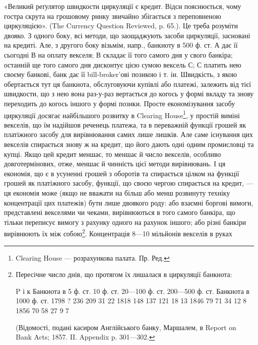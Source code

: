 «Великий реґулятор швидкости циркуляції є кредит. Відси пояснюється,
чому гостра скрута на грошовому ринку звичайно збігається з переповненою
циркуляцією». (The Currency Question Reviewed, p. 65.). Це треба розуміти
двояко. З одного боку, всі методи, що заощаджують засоби циркуляції, засновані
на кредиті. Але, з другого боку візьмім, напр., банкноту в 500 ф. ст. А дає її
сьогодні В на оплату векселя; В складає її того самого дня у свого банкіра;
останній ще того самого дня дисконтує цією сумою вексель С; С платить нею
своєму банкові, банк дає її bill-broker’ові позикою і т. ін. Швидкість, з якою
обертається тут ця банкнота, обслуговуючи купівлі або платежі, залежить від
тієї швидкости, що з нею вона раз-у-раз вертається до когось у формі вкладу
та знову переходить до когось іншого у формі позики. Просте економізування
засобу циркуляції досягає найбільшого розвитку в Clearing House\footnote*{
Clearing House — розрахункова палата. Пр. Ред.
}, у простій
виміні векселів, що їм надійшов реченець платежа, та в переважній функції
грошей як платіжного засобу для вирівнювання самих лише лишків. Але саме
існування цих векселів спирається знову ж на кредит, що його дають одні одним
промисловці та купці. Якщо цей кредит меншає, то меншає й число векселів,
особливо довготермінових, отже, меншає й чинність цієї методи вирівнювань.
І ця економія, що є в усуненні грошей з оборотів та спирається цілком на функції
грошей як платіжного засобу, функції, що своєю чергою спирається на кредит, —
ця економія може (якщо не вважати на більш або менш розвинуту техніку
концентрації цих платежів) бути лише двоякого роду: або взаємні боргові вимоги,
представлені векселями чи чеками, вирівнюються в того самого банкіра, що тільки
переписує вимогу з рахунку одного на рахунок іншого; або різні банкіри
вирівнюють їх між собою\footnote{
Пересічне число днів, що протягом їх лишалася в циркуляції банкнота:

P і к    Банкнота в 5 ф. ст.    10 ф. ст.    20—100  ф. ст.    200—500 ф. ст. Банкнота в 1000 ф. ст.
1798         ? 236    209    31    22
1818        148    137    121    18    13
1846         79    71    34    12    8
1856         70    58    27    9    7

(Відомості, подані касиром Англійського банку, Маршалем, в Report on Bank Acts; 1857. II. Appendix
p. 301—302.
}. Концентрація 8—10 мільйонів векселів в руках